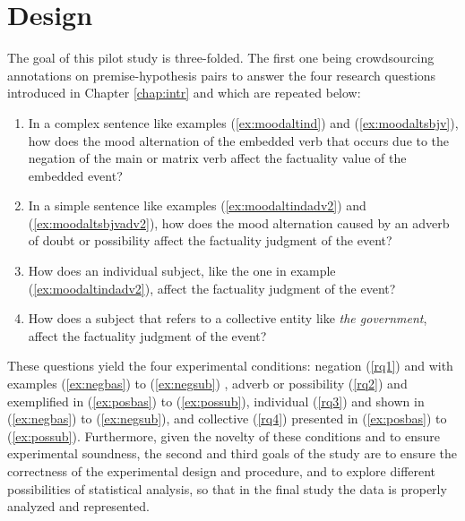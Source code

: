 \label{chap:pil}
\section{Design}
\label{sect:expdes}
The goal of this pilot study is three-folded. The first one being crowdsourcing annotations on premise-hypothesis pairs to answer the four research questions introduced in Chapter \ref{chap:intr} and which are repeated below:\\

\begin{enumerate}[RQ1.-]
        \item In a complex sentence like examples (\ref{ex:moodaltind}) and (\ref{ex:moodaltsbjv}), how does the mood alternation of the embedded verb that occurs due to the negation of the main or matrix verb affect the factuality value of the embedded event?\label{rq1}
        \item In a simple sentence like examples (\ref{ex:moodaltindadv2}) and (\ref{ex:moodaltsbjvadv2}), how does the mood alternation caused by an adverb of doubt or possibility affect the factuality judgment of the event?\label{rq2}
        \item How does an individual subject, like the one in example (\ref{ex:moodaltindadv2}), affect the factuality judgment of the event?\label{rq3}%
        \item How does a subject that refers to a collective entity like \textit{the government}, affect the factuality judgment of the event?\label{rq4}%
\end{enumerate} 

These questions yield the four experimental conditions: negation (\ref{rq1}) and with examples (\ref{ex:negbas}) to (\ref{ex:negsub}) , adverb or possibility (\ref{rq2}) and exemplified in (\ref{ex:posbas}) to (\ref{ex:possub}), individual (\ref{rq3}) and shown in (\ref{ex:negbas}) to (\ref{ex:negsub}), and collective (\ref{rq4}) presented in (\ref{ex:posbas}) to (\ref{ex:possub}). Furthermore, given the novelty of these conditions and to ensure experimental soundness, the second and third goals of the study are to ensure the correctness of the experimental design and procedure, and to explore different possibilities of statistical analysis, so that in the final study the data is properly analyzed and represented.\\

